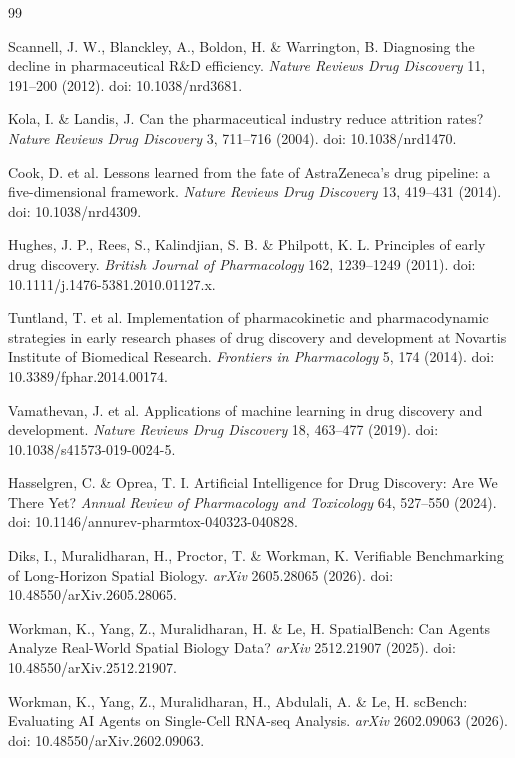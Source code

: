 {\fontsize{8.3}{10.7}\selectfont
\begin{thebibliography}{99}

 Scannell, J. W., Blanckley, A., Boldon, H. \&
Warrington, B. Diagnosing the decline in pharmaceutical R\&D efficiency.
\textit{Nature Reviews Drug Discovery} 11, 191--200 (2012). doi:
10.1038/nrd3681.

 Kola, I. \& Landis, J. Can the pharmaceutical industry
reduce attrition rates? \textit{Nature Reviews Drug Discovery} 3, 711--716
(2004). doi: 10.1038/nrd1470.

 Cook, D. et al. Lessons learned from the fate of
AstraZeneca's drug pipeline: a five-dimensional framework. \textit{Nature
Reviews Drug Discovery} 13, 419--431 (2014). doi: 10.1038/nrd4309.

 Hughes, J. P., Rees, S., Kalindjian, S. B. \& Philpott,
K. L. Principles of early drug discovery. \textit{British Journal of
Pharmacology} 162, 1239--1249 (2011). doi:
10.1111/j.1476-5381.2010.01127.x.

 Tuntland, T. et al. Implementation of pharmacokinetic
and pharmacodynamic strategies in early research phases of drug discovery and
development at Novartis Institute of Biomedical Research. \textit{Frontiers in
Pharmacology} 5, 174 (2014). doi: 10.3389/fphar.2014.00174.

 Vamathevan, J. et al. Applications of machine learning
in drug discovery and development. \textit{Nature Reviews Drug Discovery} 18,
463--477 (2019). doi: 10.1038/s41573-019-0024-5.

 Hasselgren, C. \& Oprea, T. I. Artificial
Intelligence for Drug Discovery: Are We There Yet? \textit{Annual Review of
Pharmacology and Toxicology} 64, 527--550 (2024). doi:
10.1146/annurev-pharmtox-040323-040828.

 Diks, I., Muralidharan, H., Proctor, T. \&
Workman, K. Verifiable Benchmarking of Long-Horizon Spatial Biology.
\textit{arXiv} 2605.28065 (2026). doi: 10.48550/arXiv.2605.28065.

 Workman, K., Yang, Z., Muralidharan, H. \& Le, H.
SpatialBench: Can Agents Analyze Real-World Spatial Biology Data? \textit{arXiv}
2512.21907 (2025). doi: 10.48550/arXiv.2512.21907.

 Workman, K., Yang, Z., Muralidharan, H., Abdulali, A. \&
Le, H. scBench: Evaluating AI Agents on Single-Cell RNA-seq Analysis.
\textit{arXiv} 2602.09063 (2026). doi: 10.48550/arXiv.2602.09063.


\end{thebibliography}}
